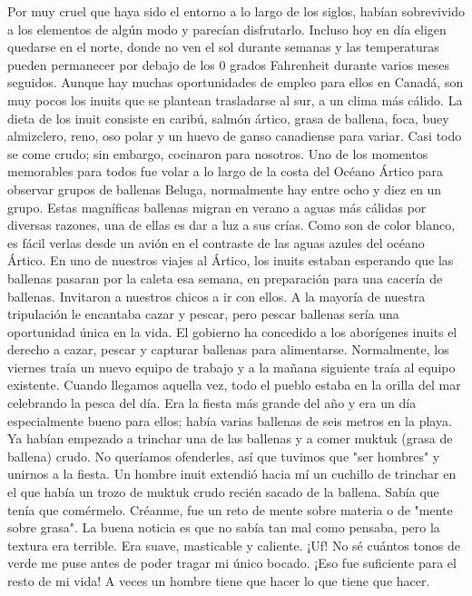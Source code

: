 \documentclass[twoside, 12pt]{book}
\begin{document}
Por muy cruel que haya sido el entorno a lo largo de los siglos, habían sobrevivido a los elementos de algún modo y parecían disfrutarlo. Incluso hoy en día eligen quedarse en el norte, donde no ven el sol durante semanas y las temperaturas pueden permanecer por debajo de los 0 grados Fahrenheit durante varios meses seguidos. Aunque hay muchas oportunidades de empleo para ellos en Canadá, son muy pocos los inuits que se plantean trasladarse al sur, a un clima más cálido. La dieta de los inuit consiste en caribú, salmón ártico, grasa de ballena, foca, buey almizclero, reno, oso polar y un huevo de ganso canadiense para variar. Casi todo se come crudo; sin embargo, cocinaron para nosotros. Uno de los momentos memorables para todos fue volar a lo largo de la costa del Océano Ártico para observar grupos de ballenas Beluga, normalmente hay entre ocho y diez en un grupo. Estas magníficas ballenas migran en verano a aguas más cálidas por diversas razones, una de ellas es dar a luz a sus crías. Como son de color blanco, es fácil verlas desde un avión en el contraste de las aguas azules del océano Ártico.
En uno de nuestros viajes al Ártico, los inuits estaban esperando que las ballenas pasaran por la caleta esa semana, en preparación para una cacería de ballenas. Invitaron a nuestros chicos a ir con ellos. A la mayoría de nuestra tripulación le encantaba cazar y pescar, pero pescar ballenas sería una oportunidad única en la vida. El gobierno ha concedido a los aborígenes inuits el derecho a cazar, pescar y capturar ballenas para alimentarse. Normalmente, los viernes traía un nuevo equipo de trabajo y a la mañana siguiente traía al equipo existente. Cuando llegamos aquella vez, todo el pueblo estaba en la orilla del mar celebrando la pesca del día. Era la fiesta más grande del año y era un día especialmente bueno para ellos; había varias ballenas de seis metros en la playa. Ya habían empezado a trinchar una de las ballenas y a comer muktuk (grasa de ballena) crudo. No queríamos ofenderles, así que tuvimos que "ser hombres" y unirnos a la fiesta. Un hombre inuit extendió hacia mí un cuchillo de trinchar en el que había un trozo de muktuk crudo recién sacado de la ballena. Sabía que tenía que comérmelo. Créanme, fue un reto de mente sobre materia o de "mente sobre grasa". La buena noticia es que no sabía tan mal como pensaba, pero la textura era terrible. Era suave, masticable y caliente. ¡Uf! No sé cuántos tonos de verde me puse antes de poder tragar mi único bocado. ¡Eso fue suficiente para el resto de mi vida! A veces un hombre tiene que hacer lo que tiene que hacer.\\
\end{document}
